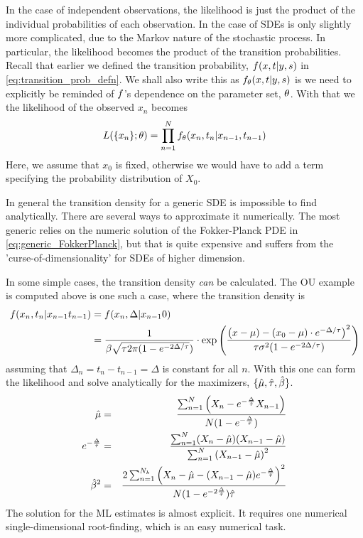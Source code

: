 In the case of independent observations, the
likelihood is just the product of the individual probabilities of each observation. In the case of SDEs is only
slightly more complicated, due to the Markov nature of the stochastic process. In particular,
the likelihood becomes the product of the transition probabilities. Recall that
earlier we defined the transition probability, ${f}(x,t| y,s)$ in
\cref{eq:transition_prob_defn}. We shall also write this as ${f}_{ \theta}(x,t|
y,s)$ is we need to explicitly be reminded of ${f}$'s dependence on the
parameter set, ${ \theta}$. With that we the likelihood of the observed $x_n$
becomes
\begin{equation}
L(\{x_n\}; { \theta}) = \prod_{n=1}^{N} f_{ \theta}(x_n, t_n| x_{n-1}, t_{n-1})
\label{eq:SDE_discrete_likelihood}
\end{equation}
Here, we assume that $x_0$ is fixed, otherwise we would have to add a term
specifying the probability distribution of $X_0$.

In general the transition density for a generic SDE is impossible to find
analytically. There are several ways to approximate it numerically. The most
generic relies on the numeric solution of the Fokker-Planck PDE in
\cref{eq:generic_FokkerPlanck}, but that is quite expensive and suffers from the
'curse-of-dimensionality' for SDEs of higher dimension. 

In some simple cases, the transition density {\sl can} be calculated. The OU
example is computed above is one such a case, where the transition density is
\begin{align*}
f(x_n, t_n| x_{n-1} t_{n-1}) &=
 f(x_n, \Delta| x_{n-1} 0)\\& =
 \frac{1}{ \beta \sqrt{{ \tau } 2\pi(1 -  e^{-2 \Delta/{ \tau }}})}
 	\cdot \exp\left(\frac{\left( x - \mu)  - (x_{0} - \mu) \cdot
 	 e^{-\Delta/{ \tau }} \right)^2  } {{\tau} \sigma^2  (1-e^{-2 \Delta/{ \tau }})}
 	\right) 
\end{align*}
assuming that $\Delta_n = t_n-t_{n-1} = \Delta$ is constant for all $n$.
With this one can form the likelihood and solve analytically for the
maximizers, $\{\hat{{\mu }} , \hat{{ \tau }}, \hat{\beta} \}$.
\begin{eqnarray} 
\hat{ \mu} &=& 
\frac{  \sum_{n=1}^{N } 
     \left( X_n - e^{-\frac{\Delta} {\hat {{ \tau }}}} X_{n-1} \right)} 
	 { N( 1-e^{-\frac {\Delta} {\hat {{ \tau }}}}) }
\\
e^{-\frac {\Delta}{\hat{{ \tau }}} } &=& 
\frac { \sum_{n=1}^{N} 
			( X_n -  \hat \mu)(X_{n-1} -  \hat \mu) }
    {   \sum_{n=1}^{N } \left( X_{n-1} - \hat \mu
    \right)^2 }
\\
\hat\beta^2 &=&  
\frac{ 2  \sum_{n=1}^{N_k}  \left( X_n - \hat \mu - (X_{n-1} -
\hat \mu) e^{-\frac {\Delta} {\hat {{ \tau }}}} \right)^2 } 
	  { N (1-e^{-2\frac {\Delta} {\hat {{ \tau }}}}) \hat {{ \tau }}}
\end{eqnarray}
The solution for the ML estimates is almost explicit. It requires one numerical
single-dimensional root-finding, which is an easy numerical task.

